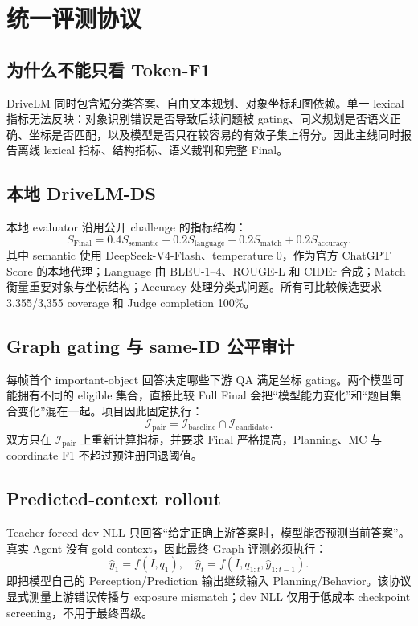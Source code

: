 \documentclass[UTF8,a4paper,11pt]{ctexart}
\begin{document}
\section{统一评测协议}
\subsection{为什么不能只看 Token-F1}
DriveLM 同时包含短分类答案、自由文本规划、对象坐标和图依赖。单一 lexical 指标无法反映：对象识别错误是否导致后续问题被 gating、同义规划是否语义正确、坐标是否匹配，以及模型是否只在较容易的有效子集上得分。因此主线同时报告离线 lexical 指标、结构指标、语义裁判和完整 Final。

\subsection{本地 DriveLM-DS}
本地 evaluator 沿用公开 challenge 的指标结构：
\[
S_{\mathrm{Final}}
=0.4S_{\mathrm{semantic}}
+0.2S_{\mathrm{language}}
+0.2S_{\mathrm{match}}
+0.2S_{\mathrm{accuracy}}.
\]
其中 semantic 使用 DeepSeek-V4-Flash、temperature 0，作为官方 ChatGPT Score 的本地代理；Language 由 BLEU-1--4、ROUGE-L 和 CIDEr 合成；Match 衡量重要对象与坐标结构；Accuracy 处理分类式问题。所有可比较候选要求 3,355/3,355 coverage 和 Judge completion 100\%。

\subsection{Graph gating 与 same-ID 公平审计}
每帧首个 important-object 回答决定哪些下游 QA 满足坐标 gating。两个模型可能拥有不同的 eligible 集合，直接比较 Full Final 会把“模型能力变化”和“题目集合变化”混在一起。项目因此固定执行：
\[
\mathcal I_{\mathrm{pair}}
=\mathcal I_{\mathrm{baseline}}\cap\mathcal I_{\mathrm{candidate}}.
\]
双方只在 \(\mathcal I_{\mathrm{pair}}\) 上重新计算指标，并要求 Final 严格提高，Planning、MC 与 coordinate F1 不超过预注册回退阈值。

\subsection{Predicted-context rollout}
Teacher-forced dev NLL 只回答“给定正确上游答案时，模型能否预测当前答案”。真实 Agent 没有 gold context，因此最终 Graph 评测必须执行：
\[
\hat y_1=f(I,q_1),\quad
\hat y_t=f(I,q_{1:t},\hat y_{1:t-1}).
\]
即把模型自己的 Perception/Prediction 输出继续输入 Planning/Behavior。该协议显式测量上游错误传播与 exposure mismatch；dev NLL 仅用于低成本 checkpoint screening，不用于最终晋级。
\end{document}
